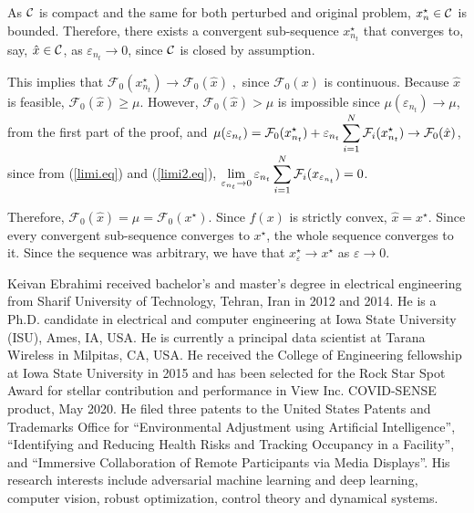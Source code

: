 \documentclass[journal,twoside,web]{ieeecolor}
\begin{document}
As ${\cal C}$ is compact and the same for both perturbed and original problem, $x^\star_{n}\in {\cal C}$ is bounded.  Therefore, there exists a convergent sub-sequence $x_{n_t}^\star$ that converges to, say, $\hat{x}\in {\cal C}$, as $\varepsilon_{n_t} \to 0$, since ${\cal C}$ is closed by assumption.

This implies that
$\mathcal{F}_0(x_{n_t}^\star) \to \mathcal{F}_0(\hat{x})\;,$ since $\mathcal{F}_0(x)$ is continuous.
Because $\hat{x}$ is feasible, $\mathcal{F}_0(\hat{x})\geq \mu$.
However,  $\mathcal{F}_0(\hat{x})>\mu$ is impossible since
$
\mu(\varepsilon_{n_t})\to \mu
$,
from the first part of the proof, and $\displaystyle\mu(\varepsilon_{n_t})=\mathcal{F}_0(x^\star_{n_t})+\varepsilon_{n_t}\sum_{i=1}^N{\cal F}_{i}(x_{n_t}^\star)\to \mathcal{F}_0(\hat{x})$, since from (\ref{limi.eq}) and (\ref{limi2.eq}), $\displaystyle\lim_{\varepsilon_{n_t}\to 0}
\varepsilon_{n_t}\sum_{i=1}^N{\cal F}_{i}(x_{\varepsilon_{n_t}})=0$\;.

Therefore, $\mathcal{F}_0(\hat{x})=\mu=\mathcal{F}_0(x^\star)$. Since $f(x)$ is strictly convex, $\hat{x}=x^\star$. Since every convergent sub-sequence converges to $x^\star$, the whole sequence converges to it. Since the sequence was arbitrary, we have that $x^\star_\varepsilon\to x^\star$ as $\varepsilon\to 0$\;.




\begin{IEEEbiography}
{Keivan Ebrahimi} received bachelor's and master's degree in electrical engineering from Sharif University of Technology, Tehran, Iran in 2012 and 2014. He is a Ph.D. candidate in electrical and computer engineering at Iowa State University (ISU), Ames, IA, USA. He is currently a principal data scientist at Tarana Wireless in Milpitas, CA, USA. He received the College of Engineering fellowship at Iowa State University in 2015 and has been selected for the Rock Star Spot Award for stellar contribution and performance in View Inc. COVID-SENSE product, May 2020. He filed three patents to the United States Patents and Trademarks Office for “Environmental Adjustment using Artificial Intelligence”, “Identifying and Reducing Health Risks and Tracking Occupancy in a Facility”, and “Immersive Collaboration of Remote Participants via Media Displays”. His research interests include adversarial machine learning and deep learning, computer vision, robust optimization, control theory and dynamical systems.
\end{IEEEbiography}
\end{document}
